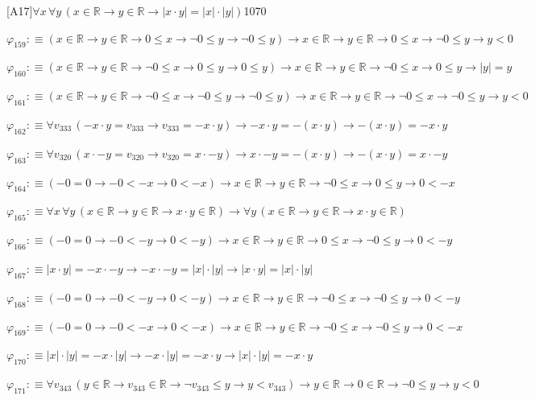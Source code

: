 \begin{fullproof}{[A17]}{$\forall x\,\forall y\,(x \in \mathbb{R} \to y \in \mathbb{R} \to \lvert x \cdot y \rvert = \lvert x \rvert \cdot \lvert y \rvert)$}{1070}
\begin{abbrevlist}
\item $\varphi_{159} :\equiv (x \in \mathbb{R} \to y \in \mathbb{R} \to 0 \leq x \to \neg 0 \leq y \to \neg 0 \leq y) \to x \in \mathbb{R} \to y \in \mathbb{R} \to 0 \leq x \to \neg 0 \leq y \to y < 0$
\item $\varphi_{160} :\equiv (x \in \mathbb{R} \to y \in \mathbb{R} \to \neg 0 \leq x \to 0 \leq y \to 0 \leq y) \to x \in \mathbb{R} \to y \in \mathbb{R} \to \neg 0 \leq x \to 0 \leq y \to \lvert y \rvert = y$
\item $\varphi_{161} :\equiv (x \in \mathbb{R} \to y \in \mathbb{R} \to \neg 0 \leq x \to \neg 0 \leq y \to \neg 0 \leq y) \to x \in \mathbb{R} \to y \in \mathbb{R} \to \neg 0 \leq x \to \neg 0 \leq y \to y < 0$
\item $\varphi_{162} :\equiv \forall v_{333}\,(-x \cdot y = v_{333} \to v_{333} = -x \cdot y) \to -x \cdot y = -(x \cdot y) \to -(x \cdot y) = -x \cdot y$
\item $\varphi_{163} :\equiv \forall v_{320}\,(x \cdot -y = v_{320} \to v_{320} = x \cdot -y) \to x \cdot -y = -(x \cdot y) \to -(x \cdot y) = x \cdot -y$
\item $\varphi_{164} :\equiv (-0 = 0 \to -0 < -x \to 0 < -x) \to x \in \mathbb{R} \to y \in \mathbb{R} \to \neg 0 \leq x \to 0 \leq y \to 0 < -x$
\item $\varphi_{165} :\equiv \forall x\,\forall y\,(x \in \mathbb{R} \to y \in \mathbb{R} \to x \cdot y \in \mathbb{R}) \to \forall y\,(x \in \mathbb{R} \to y \in \mathbb{R} \to x \cdot y \in \mathbb{R})$
\item $\varphi_{166} :\equiv (-0 = 0 \to -0 < -y \to 0 < -y) \to x \in \mathbb{R} \to y \in \mathbb{R} \to 0 \leq x \to \neg 0 \leq y \to 0 < -y$
\item $\varphi_{167} :\equiv \lvert x \cdot y \rvert = -x \cdot -y \to -x \cdot -y = \lvert x \rvert \cdot \lvert y \rvert \to \lvert x \cdot y \rvert = \lvert x \rvert \cdot \lvert y \rvert$
\item $\varphi_{168} :\equiv (-0 = 0 \to -0 < -y \to 0 < -y) \to x \in \mathbb{R} \to y \in \mathbb{R} \to \neg 0 \leq x \to \neg 0 \leq y \to 0 < -y$
\item $\varphi_{169} :\equiv (-0 = 0 \to -0 < -x \to 0 < -x) \to x \in \mathbb{R} \to y \in \mathbb{R} \to \neg 0 \leq x \to \neg 0 \leq y \to 0 < -x$
\item $\varphi_{170} :\equiv \lvert x \rvert \cdot \lvert y \rvert = -x \cdot \lvert y \rvert \to -x \cdot \lvert y \rvert = -x \cdot y \to \lvert x \rvert \cdot \lvert y \rvert = -x \cdot y$
\item $\varphi_{171} :\equiv \forall v_{343}\,(y \in \mathbb{R} \to v_{343} \in \mathbb{R} \to \neg v_{343} \leq y \to y < v_{343}) \to y \in \mathbb{R} \to 0 \in \mathbb{R} \to \neg 0 \leq y \to y < 0$

\end{abbrevlist}
\end{fullproof}
